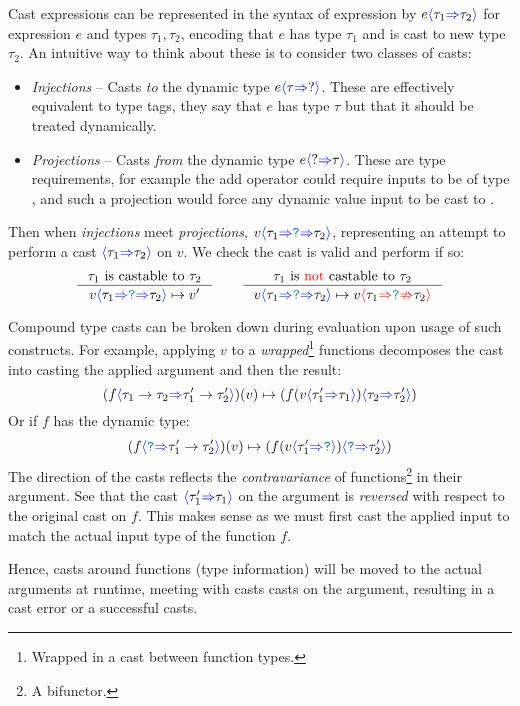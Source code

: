 Cast expressions can be represented in the syntax of expression by $e{\color{blue}\langle} \tau_1 {\color{blue}\Rightarrow} \tau_2 {\color{blue}\rangle}$ for expression $e$ and types $\tau_1, \tau_2$, encoding that $e$ has type $\tau_1$ and is cast to new type $\tau_2$. An intuitive way to think about these is to consider two classes of casts:
\begin{itemize}
\item \textit{Injections} -- Casts \textit{to} the dynamic type $e{\color{blue}\langle} \tau {\color{blue}\Rightarrow} ? {\color{blue}\rangle}$. These are effectively equivalent to type tags, they say that $e$ has type $\tau$ but that it should be treated dynamically.
\item \textit{Projections} -- Casts \textit{from} the dynamic type $e{\color{blue}\langle} ? {\color{blue}\Rightarrow} \tau {\color{blue}\rangle}$. These are type requirements, for example the add operator could require inputs to be of type , and such a projection would force any dynamic value input to be cast to . 
\end{itemize}
Then when \textit{injections} meet \textit{projections}, $v{\color{blue}\langle} \tau_1 {\color{blue}\Rightarrow} {\color{teal}\texttt{?}} {\color{blue}\Rightarrow} \tau_2 {\color{blue}\rangle}$, representing an attempt to perform a cast ${\color{blue}\langle} \tau_1 {\color{blue}\Rightarrow} \tau_2 {\color{blue}\rangle}$ on $v$. We check the cast is valid and perform if so:
\[\inference{\tau_1 \text{ is castable to } \tau_2}{v\scastcast{\tau_1}{\dyn}{\tau_2} \mapsto v'} \qquad \inference{\tau_1  \text{ is {\color{red} not }castable to }  \tau_2}{v\scastcast{\tau_1}{\dyn}{\tau_2} \mapsto v\scasterror{\tau_1}{\tau_2}}\]


Compound type casts can be broken down during evaluation upon usage of such constructs. For example, applying $v$ to a \textit{wrapped}\footnote{Wrapped in a cast between function types.} functions decomposes the cast into casting the applied argument and then the result:
\[(f{\color{blue}\langle} \tau_1 \to \tau_2 {\color{blue}\Rightarrow} \tau_1' \to \tau_2' {\color{blue}\rangle})(v) \mapsto (f(v {\color{blue}\langle} \tau_1' {\color{blue}\Rightarrow} \tau_1 {\color{blue}\rangle}){\color{blue}\langle} \tau_2 {\color{blue}\Rightarrow} \tau_2' {\color{blue}\rangle})\]
Or if $f$ has the dynamic type:
\[(f{\color{blue}\langle} {\color{teal}\texttt{?}} {\color{blue}\Rightarrow} \tau_1' \to \tau_2' {\color{blue}\rangle})(v) \mapsto (f(v {\color{blue}\langle} \tau_1' {\color{blue}\Rightarrow} {\color{teal}\texttt{?}} {\color{blue}\rangle}){\color{blue}\langle} {\color{teal}\texttt{?}} {\color{blue}\Rightarrow} \tau_2' {\color{blue}\rangle})\]
The direction of the casts reflects the \textit{contravariance} \cite[ch. 2]{BasicCatTheory} of functions\footnote{A bifunctor.} in their argument.
See that the cast ${\color{blue}\langle} \tau_1' {\color{blue}\Rightarrow} \tau_1 {\color{blue}\rangle}$ on the argument is \textit{reversed} with respect to the original cast on $f$. This makes sense as we must first cast the applied input to match the actual input type of the function $f$.

Hence, casts around functions (type information) will be moved to the actual arguments at runtime, meeting with casts casts on the argument, resulting in a cast error or a successful casts.

